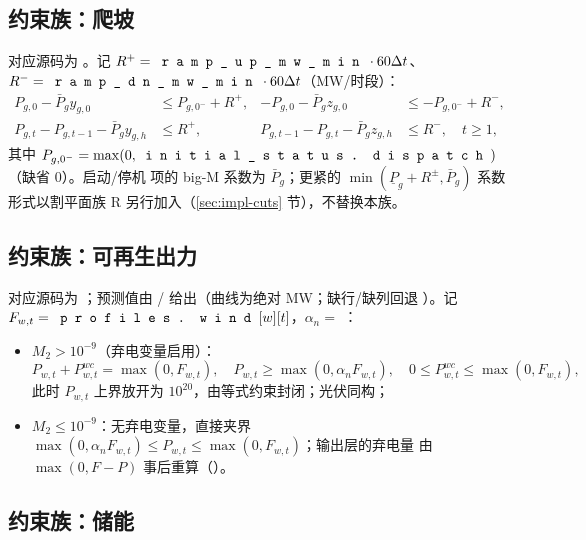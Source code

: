 \subsection{约束族：爬坡}

对应源码为 。记
$R^+=\fld{ramp\_up\_mw\_min}\cdot 60\Delta t$、$R^-=\fld{ramp\_dn\_mw\_min}\cdot
60\Delta t$（MW/时段）：
\begin{align}
P_{g,0}-\bar P_g y_{g,0}&\le P_{g,0^-}+R^+, &
-P_{g,0}-\bar P_g z_{g,0}&\le -P_{g,0^-}+R^-, \label{eq:impl-ramp0}\\
P_{g,t}-P_{g,t-1}-\bar P_g y_{g,h}&\le R^+, &
P_{g,t-1}-P_{g,t}-\bar P_g z_{g,h}&\le R^-,\quad t\ge 1, \label{eq:impl-ramp}
\end{align}
其中 $P_{g,0^-}=\max(0,\fld{initial\_status.dispatch})$（缺省 0）。启动/停机
项的 big-M 系数为 $\bar P_g$；更紧的 $\min(\underline P_g+R^\pm,\bar P_g)$
系数形式以割平面族 R 另行加入（\ref{sec:impl-cuts} 节），不替换本族。

\subsection{约束族：可再生出力}

对应源码为 ；预测值由
/
给出（曲线为绝对 MW；缺行/缺列回退 ）。记
$F_{w,t}=\fld{profiles.wind}[w][t]$，$\alpha_n=$ ：
\begin{itemize}
  \item $M_2>10^{-9}$（弃电变量启用）：
        \begin{equation}
        P_{w,t}+P^{wc}_{w,t}=\max(0,F_{w,t}),\quad
        P_{w,t}\ge\max(0,\alpha_n F_{w,t}),\quad
        0\le P^{wc}_{w,t}\le\max(0,F_{w,t}),
        \label{eq:impl-renew-curt}
        \end{equation}
        此时 $P_{w,t}$ 上界放开为 $10^{20}$，由等式约束封闭；光伏同构；
  \item $M_2\le 10^{-9}$：无弃电变量，直接夹界
        $\max(0,\alpha_n F_{w,t})\le P_{w,t}\le\max(0,F_{w,t})$；输出层的弃电量
        由 $\max(0,F-P)$ 事后重算（）。
\end{itemize}

\subsection{约束族：储能}

